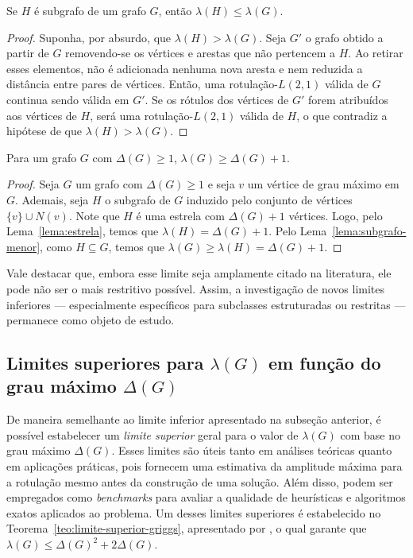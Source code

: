 \begin{lema}
\label{lema:subgrafo-menor}
Se \(H\) é subgrafo de um grafo \(G\), então \( \lambda(H) \leq \lambda(G) \).
\end{lema}
\begin{proof}
    Suponha, por absurdo, que \( \lambda(H) > \lambda(G) \). Seja \( G' \) o grafo obtido a partir de \( G \) removendo-se os vértices e arestas que não pertencem a \( H \). Ao retirar esses elementos, não é adicionada nenhuma nova aresta e nem reduzida a distância entre pares de vértices. Então, uma rotulação-\(L(2,1)\) válida de \( G \) continua sendo válida em \( G' \). Se os rótulos dos vértices de \( G' \) forem atribuídos aos vértices de \( H \), será uma rotulação-\(L(2,1)\) válida de \( H \), o que contradiz a hipótese de que \( \lambda(H) > \lambda(G) \).
\end{proof}

\begin{cor}
\label{cor:limite-inferior}
Para um grafo $G$ com $\Delta(G)\geq 1$, $\lambda(G) \geq \Delta(G) + 1$.
\end{cor}
\begin{proof}
Seja $G$ um grafo com $\Delta(G)\geq 1$ e seja $v$ um vértice de grau máximo em $G$. Ademais, seja $H$ o subgrafo de $G$ induzido pelo conjunto de vértices $\{v\}\cup N(v)$. Note que $H$ é uma estrela com $\Delta(G)+1$ vértices. Logo, pelo Lema~\ref{lema:estrela}, temos que \( \lambda(H) = \Delta(G)+1 \). Pelo Lema~\ref{lema:subgrafo-menor}, como \( H \subseteq G \), temos que \( \lambda(G) \geq \lambda(H) = \Delta(G)+1\).
\end{proof}

Vale destacar que, embora esse limite seja amplamente citado na literatura, ele pode não ser o mais restritivo possível. Assim, a investigação de novos limites inferiores — especialmente específicos para subclasses estruturadas ou restritas — permanece como objeto de estudo.

\subsection{Limites superiores para $\lambda(G)$ em função do grau máximo $\Delta(G)$}

De maneira semelhante ao limite inferior apresentado na subseção anterior, é possível estabelecer um \emph{limite superior} geral para o valor de $\lambda(G)$ com base no grau máximo $\Delta(G)$. Esses limites são úteis tanto em análises teóricas quanto em aplicações práticas, pois fornecem uma estimativa da amplitude máxima para a rotulação mesmo antes da construção de uma solução. Além disso, podem ser empregados como \textit{benchmarks} para avaliar a qualidade de heurísticas e algoritmos exatos aplicados ao problema. Um desses limites superiores é estabelecido no Teorema~\ref{teo:limite-superior-griggs}, apresentado por , o qual garante que $\lambda(G) \leq \Delta(G)^2 + 2\Delta(G)$.

